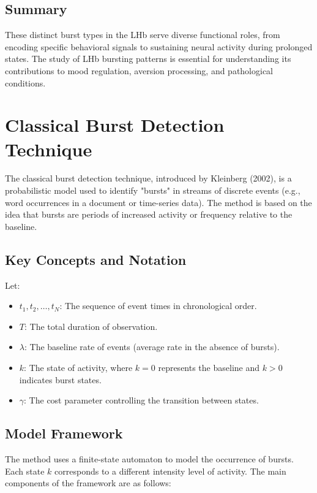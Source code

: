 \documentclass[a4paper,9pt]{extarticle}
\begin{document}
\subsection{Summary}
These distinct burst types in the LHb serve diverse functional roles, from encoding specific behavioral signals to sustaining neural activity during prolonged states. The study of LHb bursting patterns is essential for understanding its contributions to mood regulation, aversion processing, and pathological conditions.

\section{Classical Burst Detection Technique}

The classical burst detection technique, introduced by Kleinberg (2002), is a probabilistic model used to identify "bursts" in streams of discrete events (e.g., word occurrences in a document or time-series data). The method is based on the idea that bursts are periods of increased activity or frequency relative to the baseline.

\subsection{Key Concepts and Notation}
Let:
\begin{itemize}
    \item $t_1, t_2, \dots, t_N$: The sequence of event times in chronological order.
    \item $T$: The total duration of observation.
    \item $\lambda$: The baseline rate of events (average rate in the absence of bursts).
    \item $k$: The state of activity, where $k = 0$ represents the baseline and $k > 0$ indicates burst states.
    \item $\gamma$: The cost parameter controlling the transition between states.
\end{itemize}

\subsection{Model Framework}
The method uses a finite-state automaton to model the occurrence of bursts. Each state $k$ corresponds to a different intensity level of activity. The main components of the framework are as follows:
\end{document}
